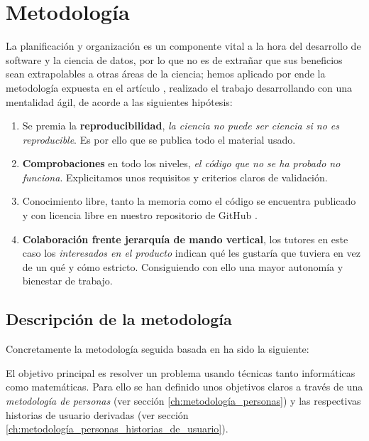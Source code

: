 %

\chapter{Metodología}

La planificación y organización es un componente vital a la hora del desarrollo de software 
y la ciencia de datos, por lo que no es de extrañar que sus beneficios sean extrapolables
a otras áreas de la ciencia; 
hemos aplicado por ende la 
metodología expuesta en el artículo \cite{DBLP:journals/corr/abs-2104-12545}, realizado 
el trabajo desarrollando con una mentalidad ágil, de acorde a las siguientes hipótesis: 

\begin{enumerate}
    \item Se premia la \textbf{reproducibilidad}, \textit{la ciencia no puede ser ciencia si no es reproducible}. Es por 
    ello que se publica todo el material usado. 
    \item \textbf{Comprobaciones} en todo los niveles, \textit{el código que no se ha probado no funciona}. 
    Explicitamos unos requisitos y criterios claros de validación. 
    \item Conocimiento libre, tanto la memoria como el código se encuentra publicado y con licencia libre en nuestro repositorio 
    de GitHub \cite{TFG-Estudio-de-las-redes-neuronales}.
    \item \textbf{Colaboración frente jerarquía de mando vertical}, los tutores en este caso 
    los \textit{interesados en el producto} 
    indican qué les gustaría que tuviera en vez de un qué y cómo estricto. Consiguiendo con ello una mayor autonomía y bienestar de trabajo.
     
\end{enumerate}  

\section{Descripción de la metodología }  

Concretamente la metodología seguida basada en \cite{que-es-un-trabajo-fin-de-x} ha sido la siguiente: 

El objetivo principal es resolver un problema usando técnicas tanto informáticas como matemáticas. Para ello 
se han definido unos objetivos claros a través de una \textit{metodología de personas} 
(ver sección \ref{ch:metodología_personas}) \cite{personas-why-and-how-you-should-use-them}
y las respectivas historias de usuario derivadas (ver sección \ref{ch:metodología_personas_historias_de_usuario}).   

